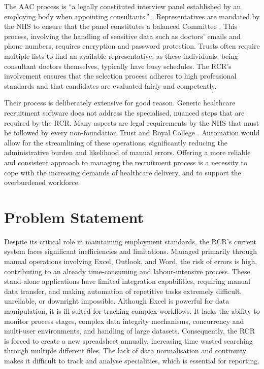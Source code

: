 The AAC process is “a legally constituted interview panel established by an employing body when appointing consultants.” \parencite{royal_college_of_surgeons_of_england_advisory_2024}. Representatives are mandated by the NHS to ensure that the panel constitutes a balanced Committee \parencite{national_health_service_appointment_of_consultants_national_2005}. This process, involving the handling of sensitive data such as doctors' emails and phone numbers, requires encryption and password protection. Trusts often require multiple lists to find an available representative, as these individuals, being consultant doctors themselves, typically have busy schedules. The RCR’s involvement ensures that the selection process adheres to high professional standards and that candidates are evaluated fairly and competently.

Their process is deliberately extensive for good reason. Generic healthcare recruitment software does not address the specialised, nuanced steps that are required by the RCR. Many aspects are legal requirements by the NHS that must be followed by every non-foundation Trust and Royal College \parencite{royal_college_of_surgeons_of_england_advisory_2024}. Automation would allow for the streamlining of these operations, significantly reducing the administrative burden and likelihood of manual errors. Offering a more reliable and consistent approach to managing the recruitment process is a necessity to cope with the increasing demands of healthcare delivery, and to support the overburdened workforce.
\section{Problem Statement}
Despite its critical role in maintaining employment standards, the RCR's current system faces significant inefficiencies and limitations. Managed primarily through manual operations involving Excel, Outlook, and Word, the risk of errors is high, contributing to an already time-consuming and labour-intensive process. These stand-alone applications have limited integration capabilities, requiring manual data transfer, and making automation of repetitive tasks extremely difficult, unreliable, or downright impossible. Although Excel is powerful for data manipulation, it is ill-suited for tracking complex workflows. It lacks the ability to monitor process stages, complex data integrity mechanisms, concurrency and multi-user environments, and handling of large datasets. Consequently, the RCR is forced to create a new spreadsheet annually, increasing time wasted searching through multiple different files. The lack of data normalisation and continuity makes it difficult to track and analyse specialities, which is essential for reporting.

